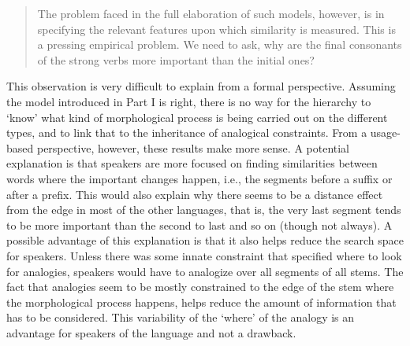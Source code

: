 \begin{quotation}
  The problem faced in the full elaboration of such models, however, is in specifying the relevant features upon which similarity is measured. This is a pressing empirical problem. We need to ask, why are the final consonants of the strong verbs more important than the initial ones? \autocite[62]{Bybee.2010}
\end{quotation}

\noindent
This observation is very difficult to explain from a formal perspective. Assuming the model introduced in Part I is right, there is no way for the hierarchy to `know' what kind of morphological process is being carried out on the different types, and to link that to the inheritance of analogical  constraints. From a usage-based perspective, however, these results make more sense. A potential explanation is that speakers are more focused on finding similarities between words where the important changes happen, i.e., the segments before a suffix or after a prefix. This would also explain why there seems to be a distance effect from the edge in most of the other languages, that is, the very last segment tends to be more important than the second to last and so on (though not always). A possible advantage of this explanation is that it also helps reduce the search space for speakers. Unless there was some innate constraint that specified where to look for analogies, speakers would have to analogize over all segments of all  stems. The fact that analogies seem to be mostly constrained to the edge of the stem where the morphological process happens, helps reduce the amount of information that has to be considered. This variability of the `where' of the analogy is an advantage for speakers of the language and not a drawback.

